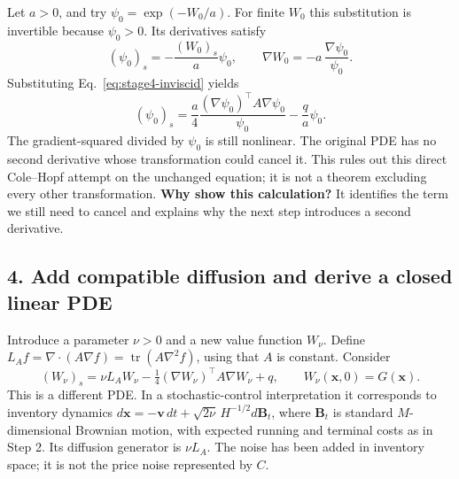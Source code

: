 Let $a>0$, and try $\psi_0=\exp(-W_0/a)$. For finite $W_0$ this
substitution is invertible because $\psi_0>0$. Its derivatives satisfy
\[
 (\psi_0)_s=-\frac{(W_0)_s}{a}\psi_0,
 \qquad\nabla W_0=-a\,\frac{\nabla\psi_0}{\psi_0}.
\]
Substituting Eq.~\eqref{eq:stage4-inviscid} yields
\begin{equation}
 (\psi_0)_s=
 \frac{a}{4}\frac{(\nabla\psi_0)^\top A\nabla\psi_0}{\psi_0}
 -\frac{q}{a}\psi_0.
 \label{eq:stage4-exponential-fails}
\end{equation}
The gradient-squared divided by $\psi_0$ is still nonlinear. The original
PDE has no second derivative whose transformation could cancel it.
This rules out this direct Cole--Hopf attempt on the unchanged equation;
it is not a theorem excluding every other transformation.
\textbf{Why show this calculation?} It identifies the term we still need
to cancel and explains why the next step introduces a second derivative.

\subsection*{4. Add compatible diffusion and derive a closed linear PDE}

Introduce a parameter $\nu>0$ and a new value function $W_\nu$. Define
$L_A f=\nabla\!\cdot(A\nabla f)
=\operatorname{tr}(A\nabla^2 f)$, using that $A$ is constant. Consider
\begin{equation}
 \boxed{(W_\nu)_s=\nu L_AW_\nu
 -\tfrac14(\nabla W_\nu)^\top A\nabla W_\nu+q,
 \qquad W_\nu(\mathbf x,0)=G(\mathbf x).}
 \label{eq:viscous}
\end{equation}
This is a different PDE. In a stochastic-control interpretation it
corresponds to inventory dynamics
$d\mathbf x=-\mathbf v\,dt+\sqrt{2\nu}\,H^{-1/2}d\mathbf B_t$,
where $\mathbf B_t$ is standard $M$-dimensional Brownian motion, with
expected running and terminal costs as in Step 2. Its diffusion generator
is $\nu L_A$. The noise has been added in inventory space; it is not the
price noise represented by $C$.

